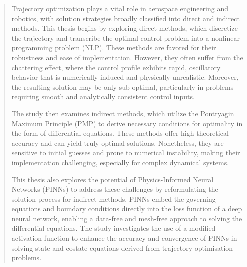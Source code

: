 \begin{abstract}
Trajectory optimization plays a vital role in aerospace engineering and robotics, with solution strategies broadly classified into direct and indirect methods. This thesis begins by exploring direct methods, which discretize the trajectory and transcribe the optimal control problem into a nonlinear programming problem (NLP). These methods are favored for their robustness and ease of implementation. However, they often suffer from the chattering effect, where the control profile exhibits rapid, oscillatory behavior that is numerically induced and physically unrealistic. Moreover, the resulting solution may be only sub-optimal, particularly in problems requiring smooth and analytically consistent control inputs.

The study then examines indirect methods, which utilize the Pontryagin Maximum Principle (PMP) to derive necessary conditions for optimality in the form of differential equations. These methods offer high theoretical accuracy and can yield truly optimal solutions. Nonetheless, they are sensitive to initial guesses and prone to numerical instability, making their implementation challenging, especially for complex dynamical systems.

This thesis also explores the potential of Physics-Informed Neural Networks (PINNs) to address these challenges by reformulating the solution process for indirect methods. PINNs embed the governing equations and boundary conditions directly into the loss function of a deep neural network, enabling a data-free and mesh-free approach to solving the differential equations. The study investigates the use of a modified activation function to enhance the accuracy and convergence of PINNs in solving state and costate equations derived from trajectory optimisation problems.


\end{abstract}
